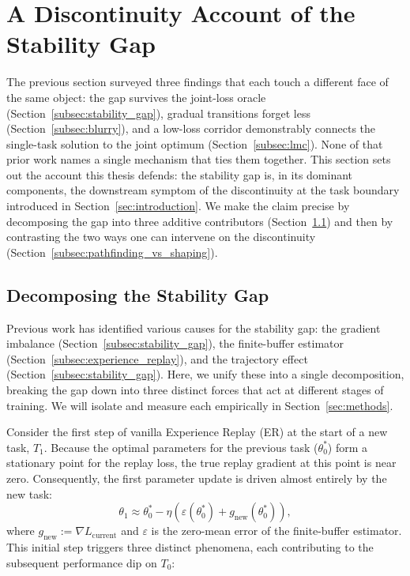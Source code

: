 \section{A Discontinuity Account of the Stability Gap}
\label{sec:account}

The previous section surveyed three findings that each touch a different face of the same object: the gap survives the joint-loss oracle (Section~\ref{subsec:stability_gap}), gradual transitions forget less (Section~\ref{subsec:blurry}), and a low-loss corridor demonstrably connects the single-task solution to the joint optimum (Section~\ref{subsec:lmc}). None of that prior work names a single mechanism that ties them together. This section sets out the account this thesis defends: the stability gap is, in its dominant components, the downstream symptom of the discontinuity at the task boundary introduced in Section~\ref{sec:introduction}. We make the claim precise by decomposing the gap into three additive contributors (Section~\ref{subsec:decomposition}) and then by contrasting the two ways one can intervene on the discontinuity (Section~\ref{subsec:pathfinding_vs_shaping}).

\subsection{Decomposing the Stability Gap}
\label{subsec:decomposition}

Previous work has identified various causes for the stability gap: the gradient imbalance (Section~\ref{subsec:stability_gap}), the finite-buffer estimator (Section~\ref{subsec:experience_replay}), and the trajectory effect (Section~\ref{subsec:stability_gap}). Here, we unify these into a single decomposition, breaking the gap down into three distinct forces that act at different stages of training. We will isolate and measure each empirically in Section~\ref{sec:methods}.

Consider the first step of vanilla Experience Replay (ER) at the start of a new task, $T_1$. Because the optimal parameters for the previous task ($\theta_0^*$) form a stationary point for the replay loss, the true replay gradient at this point is near zero. Consequently, the first parameter update is driven almost entirely by the new task:
\begin{equation}
    \theta_1 \approx \theta_0^* - \eta\left(\varepsilon(\theta_0^*) + g_{\text{new}}(\theta_0^*)\right),
    \label{eq:first_step}
\end{equation}
where $g_{\text{new}} := \nabla L_{\text{current}}$ and $\varepsilon$ is the zero-mean error of the finite-buffer estimator. This initial step triggers three distinct phenomena, each contributing to the subsequent performance dip on $T_0$:

